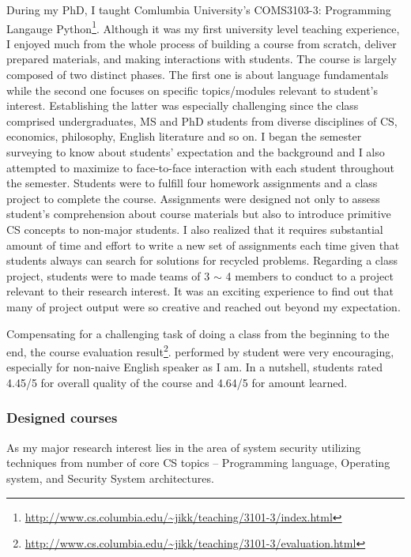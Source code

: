 \documentclass[letterpaper, 10pt]{article}
\begin{document}
\begin{small}
During my PhD, I taught Comlumbia University's COMS3103-3: Programming Langauge
Python\footnote{\url{http://www.cs.columbia.edu/~jikk/teaching/3101-3/index.html}}.
%
%
Although it was my first university level teaching experience, I enjoyed much
from the whole process of building a course from scratch, deliver prepared
materials, and making interactions with students.
% 
The course is largely composed of two distinct phases. The first one is about
language fundamentals while the second one focuses on specific topics/modules
relevant to student's interest. Establishing the latter was especially
challenging since the class comprised undergraduates, MS and PhD students from
diverse disciplines of CS, economics, philosophy, English literature and so on.
%
I began the semester surveying to know about students' expectation and the
background and I also attempted to maximize to face-to-face interaction with
each student throughout the semester.
% 
Students were to fulfill four homework assignments and a class project to
complete the course. 
%
Assignments were designed not only to assess student's comprehension about
course materials but also to introduce primitive CS concepts to non-major
students.
%
%
I also realized that it requires  substantial amount of time and effort to
write a new set of assignments each time given that students always can search
for solutions for recycled problems. 
%
Regarding a class project, students were to made teams of 3 $\sim$ 4 members to
conduct to a project relevant to their research interest.
%
It was an exciting experience to find out that many of project output were so
creative and reached out beyond my expectation.
%
%

Compensating for a challenging task of doing a class from the beginning to the
end, the course evaluation
result\footnote{\url{http://www.cs.columbia.edu/~jikk/teaching/3101-3/evaluation.html}}.
performed by student were very encouraging, especially for non-naive English
speaker as I am. In a nutshell, students rated 4.45/5 for overall quality of the
course and 4.64/5 for amount learned.

\subsubsection*{Designed courses}
As my major research interest lies in the area of system security utilizing 
techniques from number of core CS topics -- Programming language, Operating
system, and Security System architectures.


\end{small}
\end{document}

